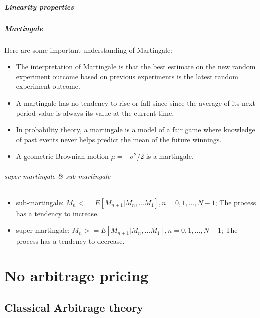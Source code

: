 \documentclass[a4paper,13pt]{report}
\begin{document}
\subsubsection{Linearity properties}

\subsubsection{Martingale}


Here are some important understanding of Martingale:
\begin{itemize}
    \item The interpretation of Martingale is that the best estimate on the new random experiment outcome based on previous experiments is the latest random experiment outcome.\cite{shreve2012stochastic1}
    \item A martingale has no tendency to rise or fall since since the average of its next period value is always its value at the current time.\cite{shreve2004stochastic1}
    \item In probability theory, a martingale is a model of a fair game where knowledge of past events never helps predict the mean of the future winnings.\cite{wiki:martingale}
    \item A geometric Brownian motion $\mu = -\sigma^2/2$ is a martingale.
\end{itemize}
  
\paragraph{super-martingale \& sub-martingale}
\begin{itemize}
    \item sub-martingale: $M_n <= E[M_{n+1}|M_n,...M_1], n=0,1,...,N-1$;
    The process has a tendency to increase.
        \item super-martingale: $M_n >= E[M_{n+1}|M_n,...M_1], n=0,1,...,N-1$;
    The process has a tendency to decrease.
\end{itemize}

\part{No arbitrage pricing}
\chapter{Classical Arbitrage theory}
\end{document}
